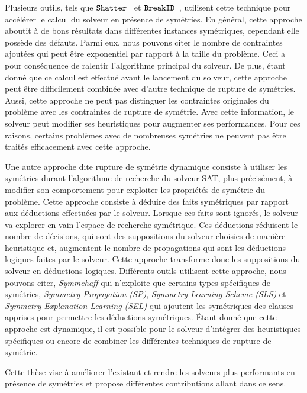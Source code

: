 Plusieurs outils, tels que $\texttt{Shatter}$~\cite{aloul06} et $\texttt{BreakID}$~\cite{devriendt2016improved}, utilisent cette technique pour accélérer le calcul du solveur en présence de symétries.
En général, cette approche aboutit à de bons résultats dans différentes instances symétriques, cependant elle possède des défauts. Parmi eux, nous pouvons citer le nombre de contraintes ajoutées qui peut être exponentiel par rapport à la taille du problème. Ceci 
a pour conséquence de ralentir l'algorithme principal du solveur.
De plus, étant donné que ce calcul est effectué avant le lancement du solveur, cette approche peut être difficilement combinée avec d'autre technique de rupture de symétries. Aussi, cette approche ne peut pas distinguer les contraintes originales du problème avec les contraintes de rupture de symétrie. Avec cette information, le solveur peut modifier ses heuristiques pour augmenter ses performances.
Pour ces raisons, certains problèmes avec de nombreuses symétries ne peuvent pas être traités efficacement avec cette approche.

Une autre approche dite rupture de symétrie dynamique consiste à utiliser les symétries durant l'algorithme de recherche du solveur SAT, plus précisément, à modifier son comportement pour exploiter les propriétés de symétrie du problème. Cette approche consiste à déduire des faits symétriques par rapport aux déductions effectuées par le solveur. Lorsque ces faits sont ignorés, le solveur va explorer en vain l'espace de recherche symétrique.
Ces déductions réduisent le nombre de décisions, qui sont des suppositions du solveur choisies de 
manière heuristique et, augmentent le nombre de propagations qui sont les déductions logiques faites par le solveur. 
Cette approche transforme donc les suppositions du solveur en déductions logiques.
Différents outils utilisent cette approche, nous pouvons citer, \textit{Symmchaff}
qui n'exploite que certains types spécifiques de symétries, \textit{Symmetry Propagation (SP)}, \textit{Symmetry Learning Scheme (SLS)} et \textit{Symmetry Explanation Learning (SEL)} qui ajoutent les symétriques des
clauses apprises pour permettre les déductions symétriques.
Étant donné que cette approche est dynamique, il est possible pour le solveur 
d'intégrer des heuristiques spécifiques ou encore de combiner les différentes techniques de rupture de symétrie.


Cette thèse vise à améliorer l'existant et rendre les solveurs plus performants en présence de symétries et
propose différentes contributions allant dans ce sens.  


